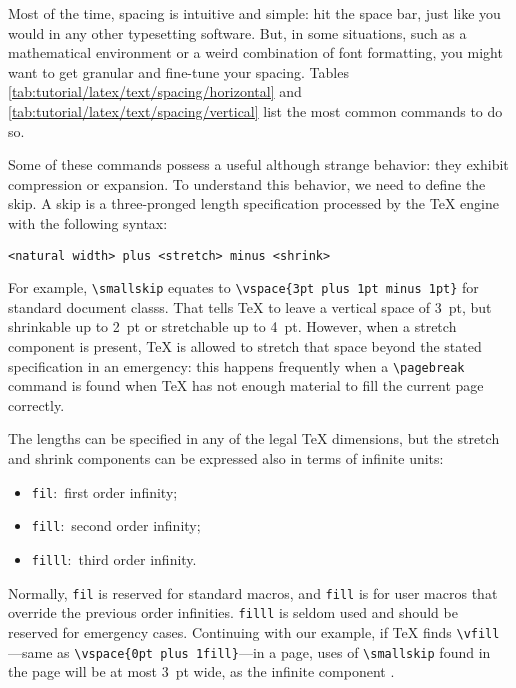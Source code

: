 Most of the time, spacing is intuitive and simple: hit the space bar, just like you would in any other typesetting software. But, in some situations, such as a mathematical \gls{environment} or a weird combination of font formatting, you might want to get granular and fine-tune your spacing. Tables \ref{tab:tutorial/latex/text/spacing/horizontal} and \ref{tab:tutorial/latex/text/spacing/vertical} list the most common \glspl{command} to do so.

Some of these \glspl{command} possess a useful although strange behavior: they exhibit compression or expansion. To understand this behavior, we need to define the skip. A skip is a three-pronged length specification processed by the \TeX{} engine with the following syntax:
\begin{center}
    \texttt{<natural width> plus <stretch> minus <shrink>}
\end{center}

For example, \texttt{\textbackslash{}smallskip} equates to \texttt{\textbackslash{}vspace\{3pt plus 1pt minus 1pt\}} for standard document \glspl{class}. That tells \TeX{} to leave a vertical space of 3~pt, but shrinkable up to 2~pt or stretchable up to 4~pt. However, when a stretch component is present, \TeX{} is allowed to stretch that space beyond the stated specification in an emergency: this happens frequently when a \texttt{\textbackslash{}pagebreak} command is found when \TeX{} has not enough material to fill the current page correctly.

The lengths can be specified in any of the legal \TeX{} dimensions, but the stretch and shrink components can be expressed also in terms of infinite units:
\begin{itemize}
    \item \texttt{fil}:~first order infinity;
    \item \texttt{fill}:~second order infinity;
    \item \texttt{filll}:~third order infinity.
\end{itemize}

Normally, \texttt{fil} is reserved for standard \glspl{macro}, and \texttt{fill} is for user \glspl{macro} that override the previous order infinities. \texttt{filll} is seldom used and should be reserved for emergency cases. Continuing with our example, if \TeX{} finds \texttt{\textbackslash{}vfill}---same as \texttt{\textbackslash{}vspace\{0pt plus 1fill\}}---in a page, uses of \texttt{\textbackslash{}smallskip} found in the page will be at most 3~pt wide, as the infinite component .

